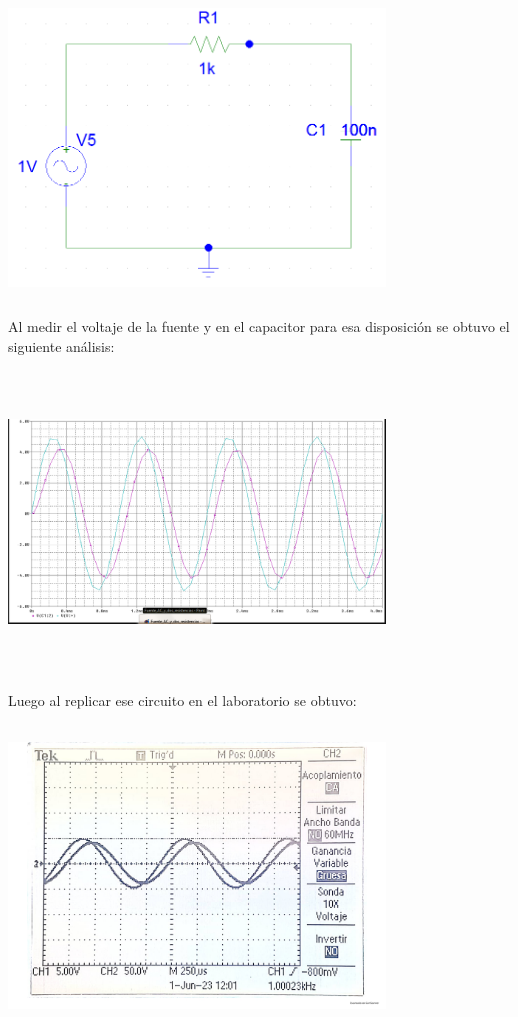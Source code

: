 \documentclass[12pt]{article}
\begin{document}
	\begin{center}
		\includegraphics[width=10cm,height=8cm]{Img/ac_rc}
	\end{center}
	
	\noindent Al medir el voltaje de la fuente y en el capacitor para esa disposición se obtuvo el siguiente análisis:
	
	\begin{center}
		\includegraphics[width=10cm,height=8cm]{Img/fuente_capacitor_spice}
	\end{center}
	
	\newpage
	
	\noindent Luego al replicar ese circuito en el laboratorio se obtuvo:
	
	\begin{center}
		\includegraphics[width=10cm,height=8cm]{Img/fuente_capacitor}
	\end{center}
	
\end{document}
